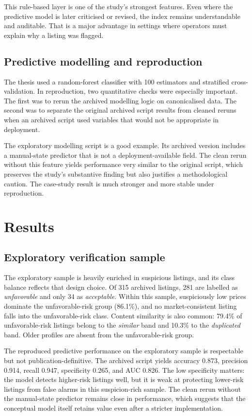 \documentclass[11pt,a4paper]{article}
\begin{document}
This rule-based layer is one of the study's strongest features. Even where the predictive model is later criticised or revised, the index remains understandable and auditable. That is a major advantage in settings where operators must explain why a listing was flagged.

\subsection{Predictive modelling and reproduction}
The thesis used a random-forest classifier with 100 estimators and stratified cross-validation. In reproduction, two quantitative checks were especially important. The first was to rerun the archived modelling logic on canonicalised data. The second was to separate the original archived script results from cleaned reruns when an archived script used variables that would not be appropriate in deployment.

The exploratory modelling script is a good example. Its archived version includes a manual-state predictor that is not a deployment-available field. The clean rerun without this feature yields performance very similar to the original script, which preserves the study's substantive finding but also justifies a methodological caution. The case-study result is much stronger and more stable under reproduction.

\section{Results}
\subsection{Exploratory verification sample}
The exploratory sample is heavily enriched in suspicious listings, and its class balance reflects that design choice. Of 315 archived listings, 281 are labelled as \emph{unfavorable} and only 34 as \emph{acceptable}. Within this sample, suspiciously low prices dominate the unfavorable-risk group (86.1\%), and no market-consistent listing falls into the unfavorable-risk class. Content similarity is also common: 79.4\% of unfavorable-risk listings belong to the \emph{similar} band and 10.3\% to the \emph{duplicated} band. Older profiles are absent from the unfavorable-risk group.

The reproduced predictive performance on the exploratory sample is respectable but not publication-definitive. The archived script yields accuracy 0.873, precision 0.914, recall 0.947, specificity 0.265, and AUC 0.826. The low specificity matters: the model detects higher-risk listings well, but it is weak at protecting lower-risk listings from false alarms in this suspicion-rich sample. The clean rerun without the manual-state predictor remains close in performance, which suggests that the conceptual model itself retains value even after a stricter implementation.
\end{document}
